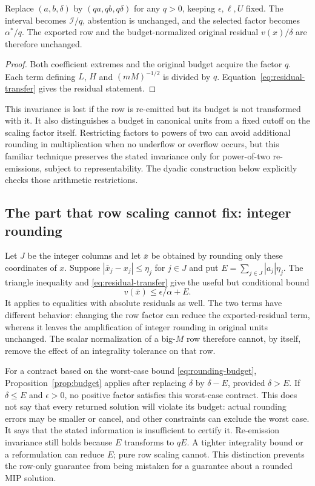 \begin{corollary}
\label{cor:budget-invariance}
Replace $(a,b,\delta)$ by $(qa,qb,q\delta)$ for any $q>0$, keeping
$\epsilon,\ell,U$ fixed. The interval becomes $\mathcal I/q$, abstention is
unchanged, and the selected factor becomes $\alpha^*/q$. The exported row and the
budget-normalized original residual $v(x)/\delta$ are therefore unchanged.
\end{corollary}
\begin{proof}
Both coefficient extremes and the original budget acquire the factor $q$.
Each term defining $L$, $H$ and $(mM)^{-1/2}$ is divided by $q$.
Equation~\eqref{eq:residual-transfer} gives the residual statement.
\end{proof}

This invariance is lost if the row is re-emitted but its budget is not transformed
with it. It also distinguishes a budget in canonical units from a fixed cutoff on
the scaling factor itself. Restricting factors to powers of two can avoid additional
rounding in multiplication when no underflow or overflow occurs, but this familiar
technique \cite{berthold2021scaling} preserves the stated invariance only for
power-of-two re-emissions, subject to representability. The dyadic construction below
explicitly checks those arithmetic restrictions.

\subsection{The part that row scaling cannot fix: integer rounding}
Let $J$ be the integer columns and let $\bar x$ be obtained by rounding only these
coordinates of $x$. Suppose $|\bar x_j-x_j|\le\eta_j$ for $j\in J$ and put
$E=\sum_{j\in J}|a_j|\eta_j$. The triangle inequality and
\eqref{eq:residual-transfer} give the useful but conditional bound
\begin{equation}\label{eq:rounding-budget}
 v(\bar x)\le \epsilon/\alpha+E.
\end{equation}
It applies to equalities with absolute residuals as well. The two terms have
different behavior: changing the row factor can reduce the exported-residual term,
whereas it leaves the amplification of integer rounding in original units unchanged.
The scalar normalization of a big-$M$ row therefore cannot, by itself, remove
the effect of an integrality tolerance on that row.

For a contract based on the worst-case bound \eqref{eq:rounding-budget},
Proposition~\ref{prop:budget} applies after replacing $\delta$ by $\delta-E$,
provided $\delta>E$. If $\delta\le E$ and $\epsilon>0$, no positive factor
satisfies this worst-case contract. This does not say that every returned solution
will violate its budget: actual rounding errors may be smaller or cancel, and other
constraints can exclude the worst case. It says that the stated information is
insufficient to certify it. Re-emission invariance still holds because $E$ transforms
to $qE$. A tighter integrality bound or a reformulation can reduce $E$; pure row
scaling cannot. This distinction prevents the row-only guarantee from being
mistaken for a guarantee about a rounded MIP solution.

